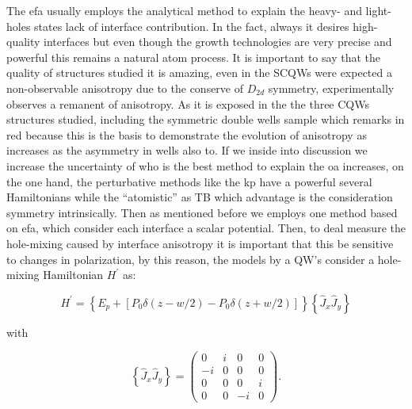 The \gls{efa} usually employs the analytical method to explain the heavy- and light- holes states lack of interface contribution\cite{xiao2001determination}. In the fact,  always it desires high-quality interfaces but even though the growth technologies are very precise and powerful this remains a natural atom process. It is important to say that the quality of structures studied it is amazing, even in the SCQWs were expected a non-observable anisotropy due to the conserve of $D_{2d}$ symmetry, experimentally observes a remanent of anisotropy. As it is exposed in the  the three  CQWs structures studied, including the symmetric double wells sample which remarks in red because this is the basis to demonstrate the evolution of anisotropy as increases as the asymmetry in wells also to. If we inside into discussion we increase the uncertainty of who is the best method to explain the \gls{oa} increases, on the one hand, the perturbative methods like the \gls{kp} have a powerful several  Hamiltonians while the ``atomistic''  as \gls{TB} which advantage is the consideration symmetry intrinsically. Then as mentioned before we employs one method based on \gls{efa}, which consider each interface a scalar potential\cite{krebs1998inversion,chen2002interface,ivchenko1996heavylight,xiao2001determination}. 
Then, to deal measure the hole-mixing caused by interface  anisotropy it is important that this be sensitive to changes in polarization, by this reason, the models by a \gls{QW}'s consider a hole-mixing Hamiltonian  $H^\prime$ as\cite{ye2001inplane,chen2002interface,xiao2001determination}:

\begin{equation}\label{eqn:chapter-2-sec-anisotropy-model-common-hamiltonian}
	H^{\prime}= \left\lbrace E_{p} + \left[P_{0}\delta\left(z-w/2\right)-P_{0}\delta\left(z+w/2\right)\right]\right\rbrace\left\lbrace \hat{J}_{x}\hat{J}_{y}\right\rbrace
\end{equation}

with

\begin{equation}\label{eqn:chapter-2-sec-anisotropy-model-jotas}
	\left\lbrace \hat{J}_{x}\hat{J}_{y}\right\rbrace=
	\begin{pmatrix}
	0 & i & 0  & 0\\	
   -i & 0 & 0  & 0\\	
	0 & 0 & 0  & i\\	
	0 & 0 & -i & 0
	\end{pmatrix}.
\end{equation}

